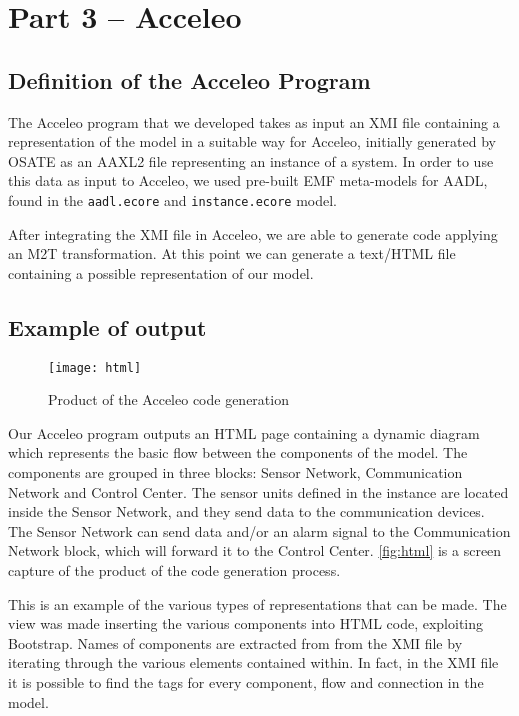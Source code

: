 \section{Part 3 -- Acceleo}

\subsection{Definition of the Acceleo Program}

The Acceleo program that we developed takes as input an XMI file containing a representation of the model in a suitable way for Acceleo, initially generated by OSATE as an AAXL2 file representing an instance of a system.
In order to use this data as input to Acceleo, we used pre-built EMF meta-models for AADL, found in the \texttt{aadl.ecore} and \texttt{instance.ecore} model.

After integrating the XMI file in Acceleo, we are able to generate code applying an M2T transformation. At this point we can generate a text/HTML file containing a possible representation of our model.

\subsection{Example of output}

\begin{figure}[h]
\caption{Product of the Acceleo code generation}
\label{fig:html}
\centering
\texttt{[image: html]}
\end{figure}

Our Acceleo program outputs an HTML page containing a dynamic diagram which represents the basic flow between the components of the model. 
The components are grouped in three blocks: Sensor Network, Communication Network and Control Center.
The sensor units defined in the instance are located inside the Sensor Network, and they send data to the communication devices. 
The Sensor Network can send data and/or an alarm signal to the Communication Network block, which will forward it to the Control Center. 
\autoref{fig:html} is a screen capture of the product of the code generation process.

This is an example of the various types of representations that can be made.
The view was made inserting the various components into HTML code, exploiting Bootstrap.
Names of components are extracted from from the XMI file by iterating through the various elements contained within.
In fact, in the XMI file it is possible to find the tags for every component, flow and connection in the model.